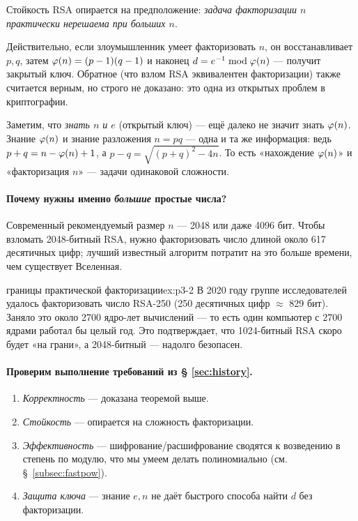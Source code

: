 \begin{importantbox}
Стойкость RSA опирается на предположение: \emph{задача факторизации $n$ практически нерешаема при больших $n$}.
\end{importantbox}

Действительно, если злоумышленник умеет факторизовать $n$, он восстанавливает $p, q$, затем $\varphi(n) = (p-1)(q-1)$ и наконец $d = e^{-1} \bmod \varphi(n)$ --- получит закрытый ключ. Обратное (что взлом RSA эквивалентен факторизации) также считается верным, но строго не доказано: это одна из открытых проблем в криптографии.

Заметим, что \emph{знать $n$ и $e$} (открытый ключ) --- ещё далеко не значит знать $\varphi(n)$. Знание $\varphi(n)$ и знание разложения $n = pq$ --- одна и та же информация: ведь $p + q = n - \varphi(n) + 1$, а $p - q = \sqrt{(p+q)^2 - 4n}$. То есть «нахождение $\varphi(n)$» и «факторизация $n$» --- задачи одинаковой сложности.

\paragraph*{Почему нужны именно \emph{большие} простые числа?} Современный рекомендуемый размер $n$ --- 2048 или даже 4096 бит. Чтобы взломать 2048-битный RSA, нужно факторизовать число длиной около 617 десятичных цифр; лучший известный алгоритм потратит на это больше времени, чем существует Вселенная.

\begin{example}{границы практической факторизации}{ex:p3-2}
В 2020 году группе исследователей удалось факторизовать число RSA-250 (250 десятичных цифр $\approx$ 829 бит). Заняло это около 2700 ядро-лет вычислений --- то есть один компьютер с 2700 ядрами работал бы целый год. Это подтверждает, что 1024-битный RSA скоро будет «на грани», а 2048-битный --- надолго безопасен.
\end{example}

\paragraph*{Проверим выполнение требований из § \ref{sec:history}.}
\begin{enumerate}
  \item \emph{Корректность} --- доказана теоремой выше.
  \item \emph{Стойкость} --- опирается на сложность факторизации.
  \item \emph{Эффективность} --- шифрование/расшифрование сводятся к возведению в степень по модулю, что мы умеем делать полиномиально (см. §~\ref{subsec:fastpow}).
  \item \emph{Защита ключа} --- знание $e, n$ не даёт быстрого способа найти $d$ без факторизации.
\end{enumerate}

